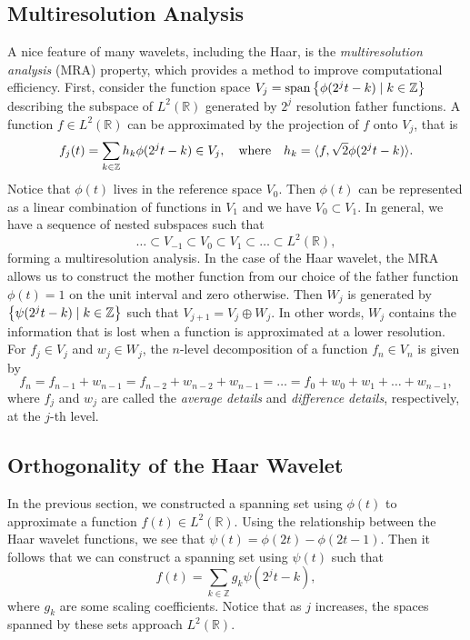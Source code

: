 \documentclass[12pt]{article}
\DeclarePairedDelimiter{\iprod}{\langle}{\rangle}
\def\RR{\mathbb{R}}
\def\ZZ{\mathbb{Z}}
\DeclareMathOperator{\spans}{span}
\theoremstyle{definition}
\begin{document}
  \subsection{Multiresolution Analysis}
  \label{sub:mra}
  A nice feature of many wavelets, including the Haar, is the \textit{multiresolution analysis} (MRA) property, which provides a method to improve computational efficiency. First, consider the function space \(V_j = \spans\qty{\phi(2^jt-k) \mid k \in \ZZ}\) describing the subspace of \(L^2(\mathbb{R})\) generated by \(2^j\) resolution father functions. A function \(f \in L^2(\RR)\) can be approximated by the projection of \(f\) onto \(V_j\), that is
  \begin{equation} \label{eqn:proj-f-onto-vj}
    f_j(t) = \sum_{k \in \ZZ} h_k \phi(2^jt-k) \in V_j, 
    \qq{where}
    h_k = \iprod{f,\sqrt{2}\phi(2^jt-k)}.
  \end{equation}
  Notice that \(\phi(t)\) lives in the reference space \(V_0\). Then \(\phi(t)\) can be represented as a linear combination of functions in \(V_1\) and we have \(V_0 \subset V_1\). In general, we have a sequence of nested subspaces such that
  \begin{equation} \label{eqn:mra}
    \dots \subset V_{-1} \subset V_0 \subset V_1 \subset \dots \subset L^2(\mathbb{R}),
  \end{equation}
  forming a multiresolution analysis. In the case of the Haar wavelet, the MRA allows us to construct the mother function from our choice of the father function \(\phi(t) = 1\) on the unit interval and zero otherwise. Then \(W_j\) is generated by \(\qty{\psi(2^jt-k) \mid k \in \ZZ}\) such that \(V_{j+1} = V_j \oplus W_j\). In other words, \(W_j\) contains the information that is lost when a function is approximated at a lower resolution. For \(f_j \in V_j\) and \(w_j \in W_j\), the \(n\)-level decomposition of a function \(f_n \in V_n\) is given by
  \[f_n = f_{n-1} + w_{n-1} = f_{n-2} + w_{n-2} + w_{n-1} = \dots = f_0 + w_0 + w_1 + \dots + w_{n-1},\]
  where \(f_j\) and \(w_j\) are called the \textit{average details} and \textit{difference details}, respectively, at the \(j\)-th level.

  \subsection{Orthogonality of the Haar Wavelet}

  In the previous section, we constructed a spanning set using \(\phi(t)\) to approximate a function \(f(t) \in L^2(\RR)\). Using the relationship between the Haar wavelet functions, we see that \(\psi(t) = \phi(2t) - \phi(2t-1)\). Then it follows that we can construct a spanning set using \(\psi(t)\) such that
  \begin{equation} \label{eqn:proj-f-onto-wj}
    f(t) = \sum_{k \in \ZZ} g_k \psi(2^jt-k),
  \end{equation}
  where \(g_k\) are some scaling coefficients. Notice that as \(j\) increases, the spaces spanned by these sets approach \(L^2(\RR)\).
\end{document}
